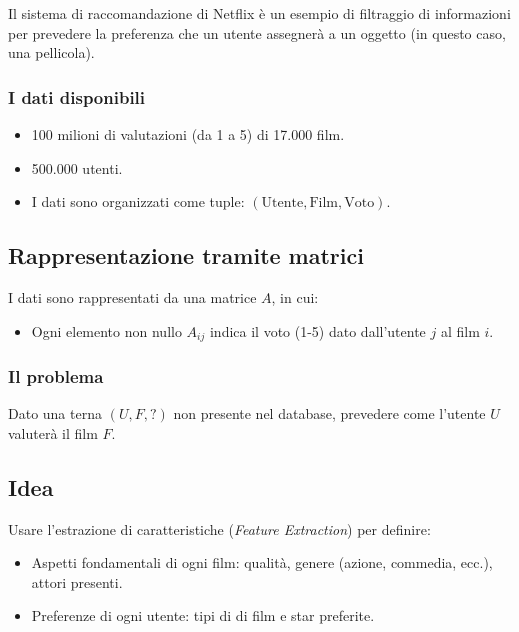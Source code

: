 \documentclass[a4paper, 11pt]{article}
\begin{document}
            Il sistema di raccomandazione di Netflix è un esempio di filtraggio di informazioni per prevedere la preferenza che un utente assegnerà a un oggetto (in questo caso, una pellicola).

            \subsubsection*{I dati disponibili}

            \begin{itemize}
                \item 100 milioni di valutazioni (da 1 a 5) di 17.000 film.
                \item 500.000 utenti.
                \item I dati sono organizzati come tuple: $(\text{Utente}, \text{Film}, \text{Voto})$.
            \end{itemize}

            \subsection*{Rappresentazione tramite matrici}
            I dati sono rappresentati da una matrice $A$, in cui:
            \begin{itemize}
                \item Ogni elemento non nullo $A_{ij}$ indica il voto (1-5) dato dall'utente $j$ al film $i$.
            \end{itemize}

            \subsubsection*{Il problema}
            Dato una terna $(U, F, ?)$ non presente nel database, prevedere come l'utente $U$ valuterà il film $F$.

            \subsection*{Idea}
            Usare l'estrazione di caratteristiche (\textit{Feature Extraction}) per definire:
            \begin{itemize}
                \item Aspetti fondamentali di ogni film: qualità, genere (azione, commedia, ecc.), attori presenti.
                \item Preferenze di ogni utente: tipi di di film e star preferite.
            \end{itemize}
\end{document}
